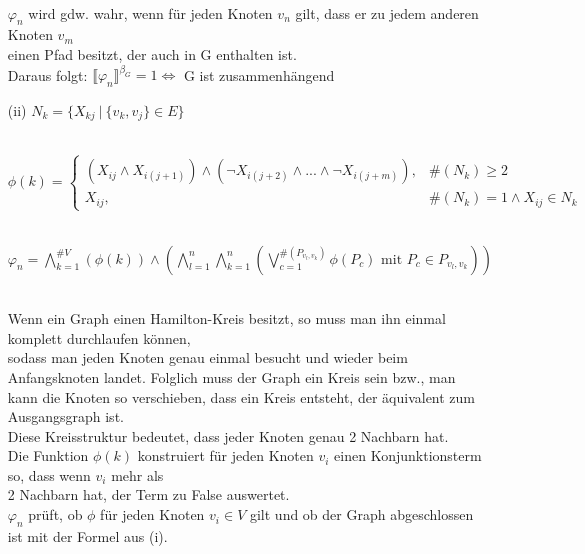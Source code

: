 \documentclass[a4paper,10pt]{article}
\begin{document}
\begin{enumerate}
	\ \\$\varphi_n$ wird gdw. wahr, wenn für jeden Knoten $v_n$ gilt, dass er zu jedem anderen Knoten $v_m$ \\
	einen Pfad besitzt, der auch in G enthalten ist. \\
	Daraus folgt: $\llbracket \varphi_n \rrbracket^{\beta_G} = 1 \Leftrightarrow$ G ist zusammenhängend

	\item[(ii)]
	\( N_k = \{X_{kj}~|~\{v_k,v_j\} \in E\} \)
	
	\ \\ \( \phi(k) = \begin{cases}	
	(X_{ij} \wedge X_{i(j+1)}) \wedge (\neg X_{i(j+2)} \wedge ... \wedge \neg X_{i(j+m)}), & \#(N_k) \geq 2\\
	X_{ij}, & \#(N_k) = 1 \wedge X_{ij} \in N_k 	
	\end{cases} \)
	
	\ \\ \( \varphi_n = \bigwedge\limits_{k = 1}^{\#V} (\phi(k)) 
	\wedge \left( \bigwedge\limits_{l = 1}^{n} \bigwedge\limits_{k = 1}^{n} 
	(\bigvee\limits_{c = 1}^{\#(P_{v_l,v_k})} \phi(P_c) \text{ mit }P_c \in P_{v_l,v_k})\right)  \)
	
	\ \\Wenn ein Graph einen Hamilton-Kreis besitzt, so muss man ihn einmal komplett durchlaufen können, \\
	sodass man jeden Knoten genau einmal besucht und wieder beim Anfangsknoten landet. Folglich muss der Graph ein 	       	Kreis sein bzw., man kann die Knoten so verschieben, dass ein Kreis entsteht, 
	der äquivalent zum Ausgangsgraph ist. \\
	Diese Kreisstruktur bedeutet, dass jeder Knoten genau 2 Nachbarn hat. \\
	Die Funktion $\phi(k)$ konstruiert für jeden Knoten $v_i$ einen Konjunktionsterm so, dass wenn $v_i$  mehr als \\
	2 Nachbarn hat, der Term zu False auswertet.\\
	$\varphi_n$ prüft, ob $\phi$ für jeden Knoten $v_i \in V$ gilt und ob der Graph abgeschlossen \\
	ist mit der Formel aus (i).

	\end{enumerate}
	
\end{document}
